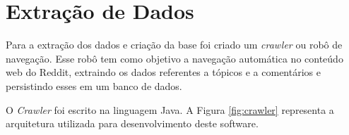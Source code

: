 % 


\section{Extração de Dados}
\label{cap:Extracao}

Para a extração dos dados e criação da base foi
criado um \textit{crawler} ou robô de navegação. Esse robô tem como objetivo a navegação
automática no conteúdo web do Reddit, extraindo os dados referentes a tópicos e
a comentários e persistindo esses em um banco de dados.

O \textit{Crawler} foi escrito na linguagem Java. A Figura \ref{fig:crawler} representa a
arquitetura utilizada para desenvolvimento deste software.

